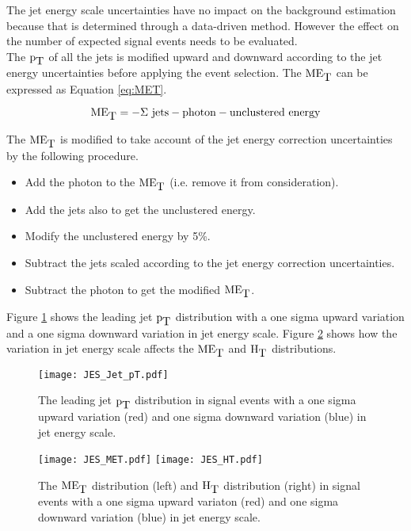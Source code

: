 The jet energy scale uncertainties have no impact on the background estimation
because that is determined through a data-driven method. However the effect on
the number of expected signal events needs to be evaluated. \\

The $\mbox{p}_{\mbox{T}}$ of all the jets is modified upward and downward according to the jet 
energy uncertainties before applying the event selection. The $\mbox{ME}_{\mbox{T}}$ can be 
expressed as Equation \ref{eq:MET}.

\begin{equation}
\mbox{ME}_{\mbox{T}} = -\Sigma \mbox{ jets} - \mbox{photon} - \mbox{unclustered energy}
\label{eq:MET}
\end{equation}

The $\mbox{ME}_{\mbox{T}}$ is modified to take account of the jet energy correction
uncertainties by the following procedure. 

\begin{itemize}
\item Add the photon to the $\mbox{ME}_{\mbox{T}}$ (i.e. remove it from consideration).
\item Add the jets also to get the unclustered energy.
\item Modify the unclustered energy by 5\%.
\item Subtract the jets scaled according to the jet energy correction 
uncertainties.
\item Subtract the photon to get the modified $\mbox{ME}_{\mbox{T}}$.
\end{itemize}

Figure \ref{fig:JES_Jet_pT} shows the leading jet $\mbox{p}_{\mbox{T}}$ distribution with a one 
sigma upward variation and a one sigma downward variation in jet energy scale. 
Figure \ref{fig:JES_MET_And_HT} shows how the variation in jet energy scale 
affects the $\mbox{ME}_{\mbox{T}}$ and $\mbox{H}_{\mbox{T}}$ distributions. \\

\begin{figure}
\begin{center}
\texttt{[image: JES\_Jet\_pT.pdf]}
\end{center}
\caption{The leading jet $\mbox{p}_{\mbox{T}}$ distribution in signal events with a one sigma
upward variation (red) and one sigma downward variation (blue) in jet energy
scale.}
\label{fig:JES_Jet_pT}
\end{figure}

\begin{figure}
\texttt{[image: JES\_MET.pdf]}
\texttt{[image: JES\_HT.pdf]}
\caption{The $\mbox{ME}_{\mbox{T}}$ distribution (left) and $\mbox{H}_{\mbox{T}}$ distribution (right) in signal
events with a one sigma upward variaton (red) and one sigma downward variation
(blue) in jet energy scale.}
\label{fig:JES_MET_And_HT}
\end{figure}

